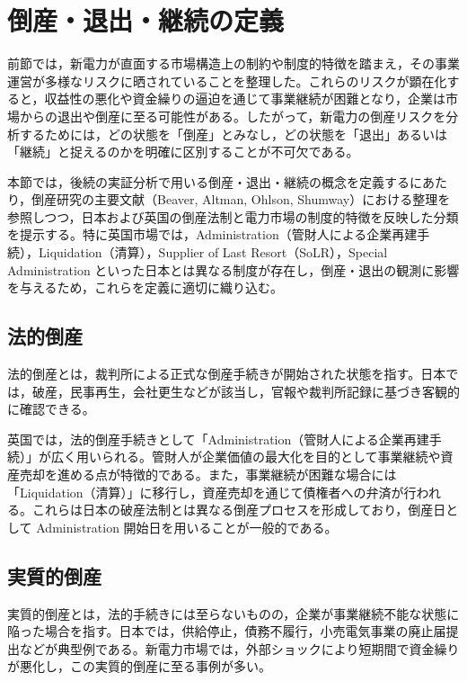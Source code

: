 
\section{倒産・退出・継続の定義}

前節では，新電力が直面する市場構造上の制約や制度的特徴を踏まえ，その事業運営が多様なリスクに晒されていることを整理した。これらのリスクが顕在化すると，収益性の悪化や資金繰りの逼迫を通じて事業継続が困難となり，企業は市場からの退出や倒産に至る可能性がある。したがって，新電力の倒産リスクを分析するためには，どの状態を「倒産」とみなし，どの状態を「退出」あるいは「継続」と捉えるのかを明確に区別することが不可欠である。

本節では，後続の実証分析で用いる倒産・退出・継続の概念を定義するにあたり，倒産研究の主要文献（Beaver, Altman, Ohlson, Shumway）における整理を参照しつつ，日本および英国の倒産法制と電力市場の制度的特徴を反映した分類を提示する。特に英国市場では，Administration（管財人による企業再建手続），Liquidation（清算），Supplier of Last Resort（SoLR），Special Administration といった日本とは異なる制度が存在し，倒産・退出の観測に影響を与えるため，これらを定義に適切に織り込む。

\subsection{法的倒産}

法的倒産とは，裁判所による正式な倒産手続きが開始された状態を指す。日本では，破産，民事再生，会社更生などが該当し，官報や裁判所記録に基づき客観的に確認できる。

英国では，法的倒産手続きとして「Administration（管財人による企業再建手続）」が広く用いられる。管財人が企業価値の最大化を目的として事業継続や資産売却を進める点が特徴的である。また，事業継続が困難な場合には「Liquidation（清算）」に移行し，資産売却を通じて債権者への弁済が行われる。これらは日本の破産法制とは異なる倒産プロセスを形成しており，倒産日として Administration 開始日を用いることが一般的である。

\subsection{実質的倒産}

実質的倒産とは，法的手続きには至らないものの，企業が事業継続不能な状態に陥った場合を指す。日本では，供給停止，債務不履行，小売電気事業の廃止届提出などが典型例である。新電力市場では，外部ショックにより短期間で資金繰りが悪化し，この実質的倒産に至る事例が多い。

